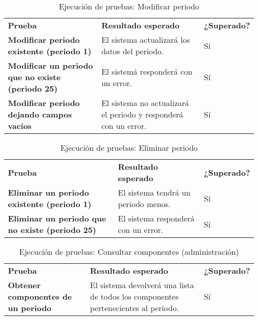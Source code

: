 \begin{table}[H]
\vspace{-4mm}
  \centering
  \caption{Ejecución de pruebas: Modificar periodo}
    \begin{tabular}{p{10em}p{21em}p{5em}}
    \toprule
    \rowcolor[rgb]{ .851,  .886,  .953} \multicolumn{3}{p{36em}}{\textbf{Modificar periodo}} \\ \midrule
    \rowcolor[rgb]{ .949,  .949,  .949} \textbf{Prueba} & \textbf{Resultado esperado} & \textbf{¿Superado?} \\ \midrule
    \textbf{Modificar periodo existente (periodo 1)} & El sistema actualizará los datos del periodo. & Sí  \\ \midrule
    \textbf{Modificar un periodo que no existe (periodo 25)} & El sistemá responderá con un error.  & Sí \\ \midrule
    \textbf{Modificar periodo dejando campos vacíos} & El sistema no actualizará el periodo y responderá con un error.  & Sí \\ \bottomrule
    \end{tabular}%
\end{table}%
\begin{table}[H]
\vspace{-4mm}
  \centering
  \caption{Ejecución de pruebas: Eliminar periodo}
    \begin{tabular}{p{11em}p{20em}p{5em}}
    \toprule
    \rowcolor[rgb]{ .851,  .886,  .953} \multicolumn{3}{p{36em}}{\textbf{Eliminar periodo}} \\ \midrule
    \rowcolor[rgb]{ .949,  .949,  .949} \textbf{Prueba} & \textbf{Resultado esperado} & \textbf{¿Superado?} \\ \midrule
    \textbf{Eliminar un periodo existente (periodo 1)} & El sistema tendrá un periodo menos.  & Sí \\ \midrule
    \textbf{Eliminar un periodo que no existe (periodo 25)} & El sistema responderá con un error.  & Sí \\ \bottomrule
    \end{tabular}%
\end{table}%
\begin{table}[H]
\vspace{-4mm}
  \centering
  \caption{Ejecución de pruebas: Consultar componentes (administración)}
    \begin{tabular}{p{11em}p{20em}p{5em}}
    \toprule
    \rowcolor[rgb]{ .851,  .886,  .953} \multicolumn{3}{p{36em}}{\textbf{Consultar componentes (administración)}} \\ \midrule
    \rowcolor[rgb]{ .949,  .949,  .949} \textbf{Prueba} & \textbf{Resultado esperado} & \textbf{¿Superado?} \\ \midrule
    \textbf{Obtener componentes de un periodo} & El sistema devolverá una lista de todos los componentes pertenecientes al periodo.  & Sí \\ \bottomrule
    \end{tabular}%
\end{table}%

